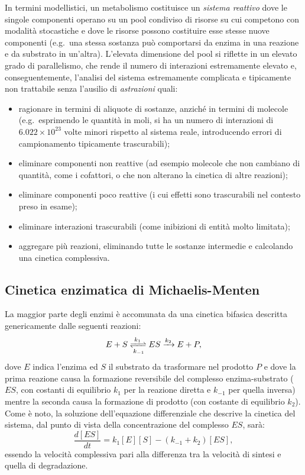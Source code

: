 		In termini modellistici, un metabolismo costituisce un \emph{sistema reattivo} dove le singole componenti operano su un pool condiviso di risorse su cui competono con modalit\`a stocastiche e dove le risorse possono costituire esse stesse nuove componenti (e.g.\ una stessa sostanza pu\`o comportarsi da enzima in una reazione e da substrato in un'altra).
		L'elevata dimensione del pool si riflette in un elevato grado di parallelismo, che rende il numero di interazioni estremamente elevato e, conseguentemente, l'analisi del sistema estremamente complicata e tipicamente non trattabile senza l'ausilio di \emph{astrazioni} quali:
		\begin{itemize}
			\item ragionare in termini di aliquote di sostanze, anzich\'e in termini di molecole (e.g.\ esprimendo le quantit\`a in moli, si ha un numero di interazioni di $6.022 \times 10^{23}$ volte minori rispetto al sistema reale, introducendo errori di campionamento tipicamente trascurabili);
			\item eliminare componenti non reattive (ad esempio molecole che non cambiano di quantit\`a, come i cofattori, o che non alterano la cinetica di altre reazioni);
			\item eliminare componenti poco reattive (i cui effetti sono trascurabili nel contesto preso in esame);
			\item eliminare interazioni trascurabili (come inibizioni di entit\`a molto limitata);
			\item aggregare pi\`u reazioni, eliminando tutte le sostanze intermedie e calcolando una cinetica complessiva.
		\end{itemize}
		
	\subsection{Cinetica enzimatica di Michaelis-Menten}
	La maggior parte degli enzimi \`e accomunata da una cinetica bifasica descritta genericamente dalle seguenti reazioni:
	\begin{equation}
	E + S \xrightleftharpoons[k_{-1}]{k_1} ES \xrightarrow{k_2} E + P,
	\label{eq:cinetica}
	\end{equation}
	dove $E$ indica l'enzima ed $S$ il substrato da trasformare nel prodotto $P$ e dove la prima reazione causa la formazione reversibile del complesso enzima-substrato ($ES$, con costanti di equilibrio $k_1$ per la reazione diretta e $k_{-1}$ per quella inversa) mentre la seconda causa la formazione di prodotto (con costante di equilibrio $k_2$).
	Come \`e noto, la soluzione dell'equazione differenziale che descrive la cinetica del sistema, dal punto di vista della concentrazione del complesso $ES$, sar\`a:
	\begin{equation*}
		\frac{d[ES]}{dt} = k_1 [E][S] - (k_{-1} + k_2) [ES],
	\end{equation*}
	essendo la velocit\`a complessiva pari alla differenza tra la velocit\`a di sintesi  e quella di degradazione.
	

